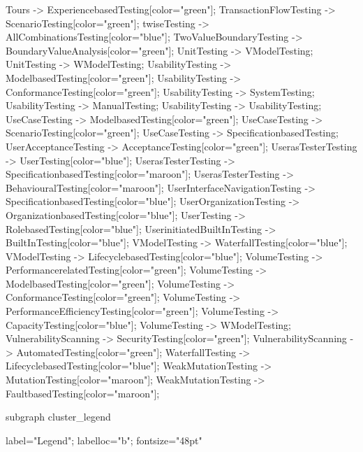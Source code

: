 \documentclass{article}
\begin{document}
{Tours -> ExperiencebasedTesting[color="green"];
TransactionFlowTesting -> ScenarioTesting[color="green"];
twiseTesting -> AllCombinationsTesting[color="blue"];
TwoValueBoundaryTesting -> BoundaryValueAnalysis[color="green"];
UnitTesting -> VModelTesting;
UnitTesting -> WModelTesting;
UsabilityTesting -> ModelbasedTesting[color="green"];
UsabilityTesting -> ConformanceTesting[color="green"];
UsabilityTesting -> SystemTesting;
UsabilityTesting -> ManualTesting;
UsabilityTesting -> UsabilityTesting;
UseCaseTesting -> ModelbasedTesting[color="green"];
UseCaseTesting -> ScenarioTesting[color="green"];
UseCaseTesting -> SpecificationbasedTesting;
UserAcceptanceTesting -> AcceptanceTesting[color="green"];
UserasTesterTesting -> UserTesting[color="blue"];
UserasTesterTesting -> SpecificationbasedTesting[color="maroon"];
UserasTesterTesting -> BehaviouralTesting[color="maroon"];
UserInterfaceNavigationTesting -> SpecificationbasedTesting[color="blue"];
UserOrganizationTesting -> OrganizationbasedTesting[color="blue"];
UserTesting -> RolebasedTesting[color="blue"];
UserinitiatedBuiltInTesting -> BuiltInTesting[color="blue"];
VModelTesting -> WaterfallTesting[color="blue"];
VModelTesting -> LifecyclebasedTesting[color="blue"];
VolumeTesting -> PerformancerelatedTesting[color="green"];
VolumeTesting -> ModelbasedTesting[color="green"];
VolumeTesting -> ConformanceTesting[color="green"];
VolumeTesting -> PerformanceEfficiencyTesting[color="green"];
VolumeTesting -> CapacityTesting[color="blue"];
VolumeTesting -> WModelTesting;
VulnerabilityScanning -> SecurityTesting[color="green"];
VulnerabilityScanning -> AutomatedTesting[color="green"];
WaterfallTesting -> LifecyclebasedTesting[color="blue"];
WeakMutationTesting -> MutationTesting[color="maroon"];
WeakMutationTesting -> FaultbasedTesting[color="maroon"];

subgraph cluster_legend {

    label="Legend";
    labelloc="b";
    fontsize="48pt"

}}
\end{document}
